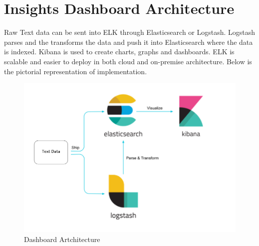 \documentclass[a4paper,12pt]{report}
\begin{document}
    \section{Insights Dashboard Architecture}
    Raw Text data can be sent into ELK through Elasticsearch or Logstash. Logstash parses and the transforms the data and push it into Elasticsearch where the data is indexed. Kibana is used to create charts, graphs and dashboards. ELK is scalable and easier to deploy in both cloud and on-premise architecture. Below is the pictorial representation of implementation.
    \newline\newline
    \begin{figure}[!h]
        \includegraphics[scale=0.5]{dashboard.png}
        \centering
        \caption{Dashboard Artchitecture}
    \end{figure}
    
\end{document}
